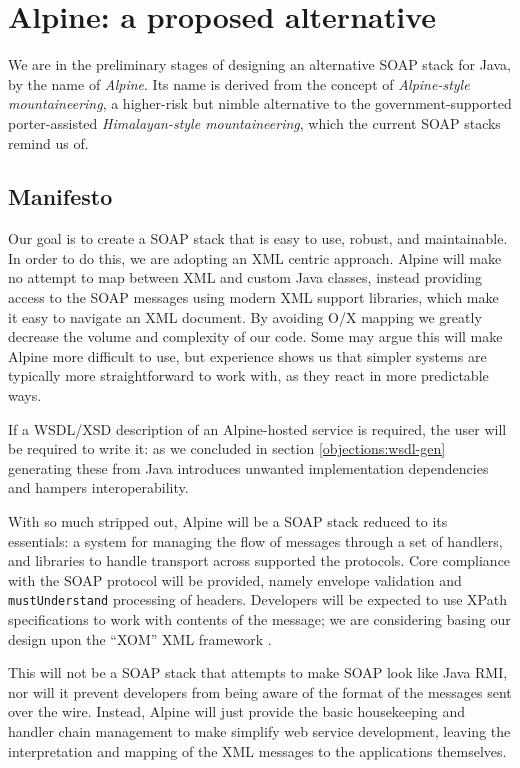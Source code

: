 \section{Alpine: a proposed alternative}
\label{alpine}

We are in the preliminary stages of designing an alternative SOAP
stack for Java, by the name of \emph{Alpine}. Its name is derived from the
concept of \emph{Alpine-style mountaineering}, a higher-risk but nimble
alternative to the government-supported porter-assisted \emph{Himalayan-style
mountaineering}, which the current SOAP stacks remind us of.
 

\subsection{Manifesto}
\label{alpine:manifesto}

Our goal is to create a SOAP stack that is easy to use, robust, and
maintainable. In order to do this, we are adopting an XML centric
approach. Alpine will make no attempt to map between XML and custom
Java classes, instead providing access to the SOAP messages using
modern XML support libraries, which make it easy to navigate an XML
document. By avoiding O/X mapping we greatly decrease the volume and
complexity of our code. Some may argue this will make Alpine more
difficult to use, but experience shows us that simpler systems are
typically more straightforward to work with, as they react in more
predictable ways.

If a WSDL/XSD description of an Alpine-hosted service is required, the
user will be required to write it: as we concluded in section
\ref{objections:wsdl-gen} generating these from Java introduces
unwanted implementation dependencies and hampers interoperability.

With so much stripped out, Alpine will be a SOAP stack reduced to its
essentials: a system for managing the flow of messages through a set
of handlers, and libraries to handle transport across supported the
protocols. Core compliance with the SOAP protocol will be provided,
namely envelope validation and \verb|mustUnderstand| processing of
headers. Developers will be expected to use XPath specifications to
work with contents of the message; we are considering basing our
design upon the ``XOM'' XML framework \cite{harold:xom}.

This will not be a SOAP stack that attempts to make SOAP look like
Java RMI, nor will it prevent developers from being aware of the
format of the messages sent over the wire. Instead, Alpine will just
provide the basic housekeeping and handler chain management to make
simplify web service development, leaving the interpretation and
mapping of the XML messages to the applications themselves.

